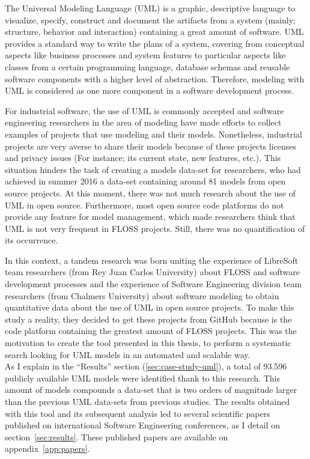 \documentclass[a4paper, 12pt]{book}
\begin{document}
The Universal Modeling Language (UML) is a graphic, descriptive language to visualize, specify, construct and document the
artifacts from a system (mainly; structure, behavior and interaction) containing a great amount of software.
UML provides a standard way to write the plans of a system, covering from conceptual aspects like business processes and
system features to particular aspects like classes from a certain programming language, database schemas and reusable
software components with a higher level of abstraction. Therefore, modeling with UML is considered as one more component
in a software development process.\par
For industrial software, the use of UML is commonly accepted and software engineering researchers in the area of modeling
have made efforts to collect examples of projects that use modeling and their models. Nonetheless, industrial projects
are very averse to share their models because of these projects licenses and privacy issues (For instance; its current
state, new features, etc.).
This situation hinders the task of creating a models data-set for researchers, who had achieved in summer 2016 a data-set
containing around 81 models from open source projects. At this moment, there was not much research about the use of UML in open source.
Furthermore, most open source code platforms do not provide any feature for model management, which made researchers think that UML
is not very frequent in FLOSS projects.
Still, there was no quantification of its occurrence.\par
In this context, a tandem research was born uniting the experience of LibreSoft team researchers (from Rey Juan Carlos University) about
FLOSS and software development processes and the experience of Software Engineering division team researchers (from Chalmers University)
about software modeling to obtain quantitative data about the use of UML in open source projects. To make this study a reality, they
decided to get these projects from GitHub because is the code platform containing the greatest amount of FLOSS projects.
This was the motivation to create the tool presented in this thesis, to perform a systematic search looking for UML models in
an automated and scalable way.\\
As I explain in the ``Results'' section (\ref{sec:case-study-uml}), a total of 93.596 publicly available UML models were identified thank to this research.
This amount of models compounds a data-set that is two orders of magnitude larger than the previous UML data-sets from previous studies. The results
obtained with this tool and its subsequent analysis led to several scientific papers published on international Software Engineering conferences,
as I detail on section~\ref{sec:results}. These published papers are available on appendix~\ref{app:papers}.
\end{document}

